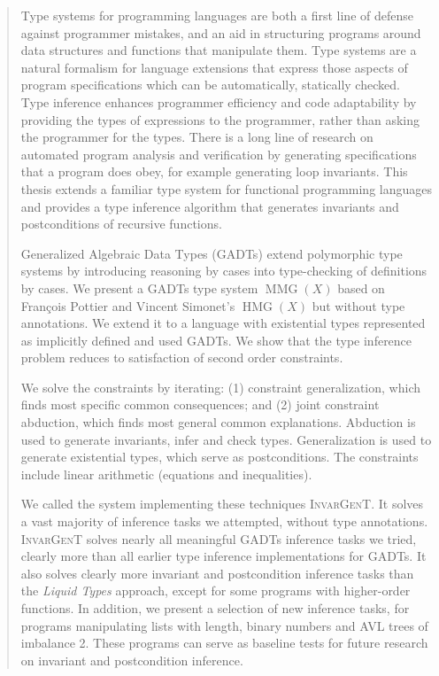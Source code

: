 \documentclass{article}
\newcommand{\tmem}[1]{{\em #1\/}}
\newcommand{\tmname}[1]{\textsc{#1}}
\newcommand{\tmop}[1]{\ensuremath{\operatorname{#1}}}
\begin{document}
\begin{abstract}
  Type systems for programming languages are both a first line of defense
  against programmer mistakes, and an aid in structuring programs around data
  structures and functions that manipulate them. Type systems are a natural
  formalism for language extensions that express those aspects of program
  specifications which can be automatically, statically checked. Type
  inference enhances programmer efficiency and code adaptability by providing
  the types of expressions to the programmer, rather than asking the
  programmer for the types. There is a long line of research on automated
  program analysis and verification by generating specifications that a
  program does obey, for example generating loop invariants. This thesis
  extends a familiar type system for functional programming languages and
  provides a type inference algorithm that generates invariants and
  postconditions of recursive functions.
  
  Generalized Algebraic Data Types (GADTs) extend polymorphic type systems by
  introducing reasoning by cases into type-checking of definitions by cases.
  We present a GADTs type system $\tmop{MMG} (X)$ based on Fran{\c c}ois
  Pottier and Vincent Simonet's $\tmop{HMG} (X)$ but without type annotations.
  We extend it to a language with existential types represented as implicitly
  defined and used GADTs. We show that the type inference problem reduces to
  satisfaction of second order constraints.
  
  We solve the constraints by iterating: (1) constraint generalization, which
  finds most specific common consequences; and (2) joint constraint abduction,
  which finds most general common explanations. Abduction is used to generate
  invariants, infer and check types. Generalization is used to generate
  existential types, which serve as postconditions. The constraints include
  linear arithmetic (equations and inequalities).
  
  We called the system implementing these techniques {\tmname{InvarGenT}}. It
  solves a vast majority of inference tasks we attempted, without type
  annotations. {\tmname{InvarGenT}} solves nearly all meaningful GADTs
  inference tasks we tried, clearly more than all earlier type inference
  implementations for GADTs. It also solves clearly more invariant and
  postcondition inference tasks than the {\tmem{Liquid Types}} approach,
  except for some programs with higher-order functions. In addition, we
  present a selection of new inference tasks, for programs manipulating lists
  with length, binary numbers and AVL trees of imbalance 2. These programs can
  serve as baseline tests for future research on invariant and postcondition
  inference.
\end{abstract}
\end{document}
